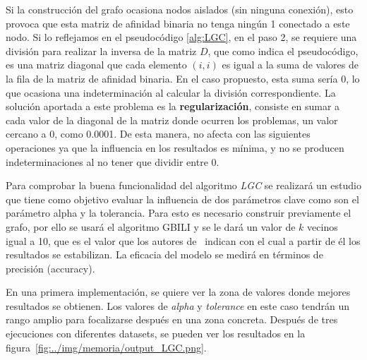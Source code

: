 Si la construcción del grafo ocasiona nodos aislados (sin ninguna conexión), esto provoca que esta matriz de afinidad binaria no tenga ningún 1 conectado a este nodo. Si lo reflejamos en el pseudocódigo \ref{alg:LGC}, en el paso 2, se requiere una división para realizar la inversa de la matriz $D$, que como indica el pseudocódigo, es una matriz diagonal que cada elemento $(i, i)$ es igual a la suma de valores de la fila de la matriz de afinidad binaria. En el caso propuesto, esta suma sería 0, lo que ocasiona una indeterminación al calcular la división correspondiente. La solución aportada a este problema es la \textbf{regularización}, consiste en sumar a cada valor de la diagonal de la matriz donde ocurren los problemas, un valor cercano a 0, como 0.0001. De esta manera, no afecta con las siguientes operaciones ya que la influencia en los resultados es mínima, y no se producen indeterminaciones al no tener que dividir entre 0.

Para comprobar la buena funcionalidad del algoritmo \textit{LGC} se realizará un estudio que tiene como objetivo evaluar la influencia de dos parámetros clave como son el parámetro alpha y la tolerancia. Para esto es necesario construir previamente el grafo, por ello se usará el algoritmo GBILI y se le dará un valor de $k$ vecinos igual a 10, que es el valor que los autores de~\cite{gbili} indican con el cual a partir de él los resultados se estabilizan. La eficacia del modelo se medirá en términos de precisión (accuracy).

En una primera implementación, se quiere ver la zona de valores donde mejores resultados se obtienen. Los valores de \textit{alpha} y \textit{tolerance} en este caso tendrán un rango amplio para focalizarse después en una zona concreta. Después de tres ejecuciones con diferentes datasets, se pueden ver los resultados en la figura~\ref{fig:../img/memoria/output_LGC.png}.

